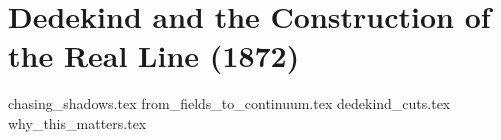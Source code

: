 \section{Dedekind and the Construction of the Real Line (1872)}

{chasing_shadows.tex}
{from_fields_to_continuum.tex}
{dedekind_cuts.tex}
{why_this_matters.tex}